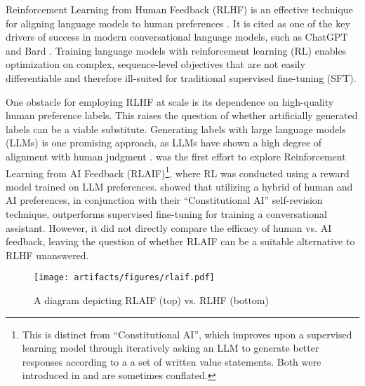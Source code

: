 \documentclass[11pt]{article}
\begin{document}
Reinforcement Learning from Human Feedback (RLHF) is an effective technique for aligning language models to human preferences \citep{stiennon2020learning,ouyang2022training}. It is cited as one of the key drivers of success in modern conversational language models, such as ChatGPT \citep{liu2023summary} and Bard \citep{bardoverview}. Training language models with reinforcement learning (RL) enables optimization on complex, sequence-level objectives that are not easily differentiable and therefore ill-suited for traditional supervised fine-tuning (SFT).


One obstacle for employing RLHF at scale is its dependence on high-quality human preference labels. This raises the question of whether artificially generated labels can be a viable substitute. Generating labels with large language models (LLMs) is one promising approach, as LLMs have shown a high degree of alignment with human judgment \citep{gilardi2023chatgpt,ding-etal-2023-gpt}. \citet{bai2022constitutional} was the first effort to explore Reinforcement Learning from AI Feedback (RLAIF)\footnote{This is distinct from ``Constitutional AI'', which improves upon a supervised learning model through iteratively asking an LLM to generate better responses according to a a set of written value statements. Both were introduced in \citet{bai2022constitutional} and are sometimes conflated.}, where RL was conducted using a reward model trained on LLM preferences. \citet{bai2022constitutional} showed that utilizing a hybrid of human and AI preferences, in conjunction with their ``Constitutional AI'' self-revision technique, outperforms supervised fine-tuning for training a conversational assistant. However, it did not directly compare the efficacy of human vs. AI feedback, leaving the question of whether RLAIF can be a suitable alternative to RLHF unanswered.

\begin{figure*}
\begin{center}
    \texttt{[image: artifacts/figures/rlaif.pdf]}
    \caption{A diagram depicting RLAIF (top) vs. RLHF (bottom)}
    \label{fig:process}
\end{center}
\end{figure*}
\end{document}
